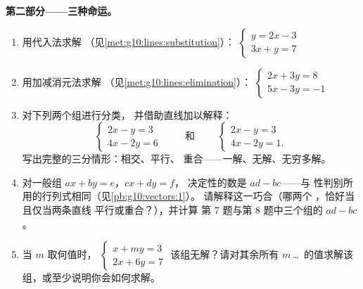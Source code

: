 \begin{problem}
\medskip
\noindent\textbf{第二部分——三种命运。}
\begin{enumerate}[resume]
  \item 用代入法求解
        （见\cref{met:g10:lines:substitution}）：
        $\begin{cases} y = 2x - 3 \\ 3x + y = 7 \end{cases}$
  \item 用加减消元法求解
        （见\cref{met:g10:lines:elimination}）：
        $\begin{cases} 2x + 3y = 8 \\ 5x - 3y = -1 \end{cases}$
  \item 对下列两个组进行分类，
        并借助直线加以解释：
        \[
        \begin{cases} 2x - y = 3 \\ 4x - 2y = 6 \end{cases}
        \qquad\text{ 和 }\qquad
        \begin{cases} 2x - y = 3 \\ 4x - 2y = 1 . \end{cases}
        \]
        写出完整的三分情形：相交、平行、
        重合——一解、无解、无穷多解。
  \item 对一般组 $ax + by = e$，$cx + dy = f$，
        决定性的数是 $ad - bc$——与
        性判别所用的行列式相同（见\cref{pb:g10:vectors:1}）。
        请解释这一巧合（哪两个
        ，恰好当且仅当两条直线
        平行或重合？），并计算
        第 7 题与第 8 题中三个组的 $ad - bc$。
  \item 当 $m$ 取何值时，
        $\begin{cases} x + my = 3 \\ 2x + 6y = 7 \end{cases}$
        该组无解？请对其余所有
        $m$\,\dots\ 的值求解该组，或至少说明你会如何求解。
\end{enumerate}


\end{problem}
